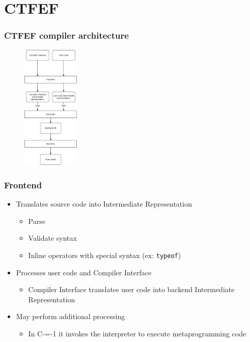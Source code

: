 \section{CTFEF}

\begin{frame}
    \frametitle{CTFEF compiler architecture}
    \begin{figure}
        
        \begin{center}
            \includegraphics[height=6cm]{pictures/compiler-structure.png}
        \end{center}
    \end{figure}

\end{frame}


\begin{frame}
    \frametitle{Frontend}

    \begin{itemize}
        \item Translates source code into Intermediate Representation\begin{itemize}
            \item Parse
            \item Validate syntax
            \item Inline operators with special syntax (ex: \lstinline|typeof|)
        \end{itemize}
        \item Processes user code and Compiler Interface \begin{itemize}
            \item Compiler Interface translates user code into backend Intermediate Representation
        \end{itemize}
        \item May perform additional processing\begin{itemize}
            \item In C-=-1 it invokes the interpreter to execute metaprogramming code
        \end{itemize}
    \end{itemize}

\end{frame}

